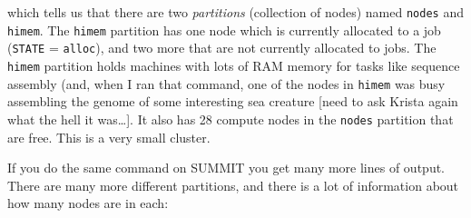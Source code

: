 \documentclass[]{krantz}
\begin{document}
which tells us that there are two \emph{partitions} (collection of nodes)
named \texttt{nodes} and \texttt{himem}. The \texttt{himem} partition has one node which is
currently allocated to a job (\texttt{STATE} = \texttt{alloc}), and two more that
are not currently allocated to jobs. The \texttt{himem} partition holds machines
with lots of RAM memory for tasks like sequence assembly (and, when I ran that
command, one of the nodes in \texttt{himem} was busy assembling the genome of
some interesting sea creature {[}need to ask Krista again what the hell it was\ldots{}{]}.
It also has 28 compute nodes in the
\texttt{nodes} partition that are free. This is a very small cluster.

If you do the same command on SUMMIT you get many more lines of output. There
are many more different partitions, and there is a lot of information about how many
nodes are in each:
\end{document}
